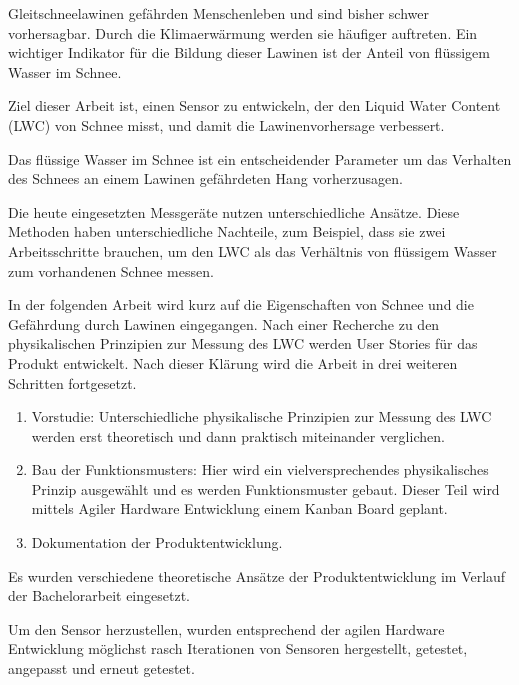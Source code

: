 Gleitschneelawinen gefährden Menschenleben und sind bisher schwer vorhersagbar. Durch die Klimaerwärmung werden sie häufiger auftreten. Ein wichtiger Indikator für die Bildung dieser Lawinen ist der Anteil von flüssigem Wasser im Schnee.

Ziel dieser Arbeit ist, einen Sensor zu entwickeln, der den Liquid Water Content (LWC) von Schnee misst, und damit die Lawinenvorhersage verbessert.


Das flüssige Wasser im Schnee ist ein entscheidender Parameter um das Verhalten des Schnees an einem Lawinen gefährdeten Hang  vorherzusagen. 

Die heute eingesetzten Messgeräte nutzen unterschiedliche Ansätze. Diese Methoden haben unterschiedliche Nachteile, zum Beispiel, dass sie zwei Arbeitsschritte brauchen, um den LWC als das Verhältnis von flüssigem Wasser zum vorhandenen Schnee  messen. 

In der folgenden Arbeit wird kurz auf die Eigenschaften von Schnee und die Gefährdung durch Lawinen eingegangen. Nach einer Recherche zu den physikalischen Prinzipien zur Messung des LWC werden User Stories für das Produkt entwickelt. Nach dieser Klärung wird die Arbeit in drei weiteren Schritten fortgesetzt.

\begin{enumerate}
\item Vorstudie: Unterschiedliche physikalische Prinzipien zur Messung des LWC werden erst theoretisch und dann praktisch miteinander verglichen.

\item Bau der Funktionsmusters: Hier wird ein vielversprechendes physikalisches Prinzip ausgewählt und es werden Funktionsmuster gebaut. Dieser Teil wird mittels Agiler Hardware Entwicklung einem Kanban Board geplant.

\item Dokumentation der Produktentwicklung.
\end{enumerate}

Es wurden verschiedene theoretische Ansätze der Produktentwicklung im Verlauf der Bachelorarbeit eingesetzt.

Um den Sensor herzustellen, wurden entsprechend der agilen Hardware Entwicklung möglichst rasch Iterationen von Sensoren hergestellt, getestet, angepasst und erneut getestet.


\iffalse


Ziel dieser Arbeit ist, einen Sensor zu entwickeln, der flüssiges Wasser im Schnee misst.
ziel dieser Arbeit ist die entwicklung eines innovativen sensors um die scheefeuchtigkeit zu messen.

Die schneefeuchtigkeit ist ein entscheidenen Parameter um Gleitschneelawinen abzuschetzten. seit 40 jahren ist wird Thema beforscht. Es gibt verschiedenste Techniken um den Schaum aus Eis, Wasser und Luft zu messen. heutige Produkte konnen den LWC messen, haben aber verschiedene schwerwigeende nachteile.

um dieses Produktentwicklung an zu gehen werden verschiedene techniken der Produktentwicklung eingesetzt. um ein sensor zu erreichen der einsatztfahig ist, wurde nach aglier hardware entwicklung moglichst schnell Itterationen von sensoren entwickelt.

\fi
